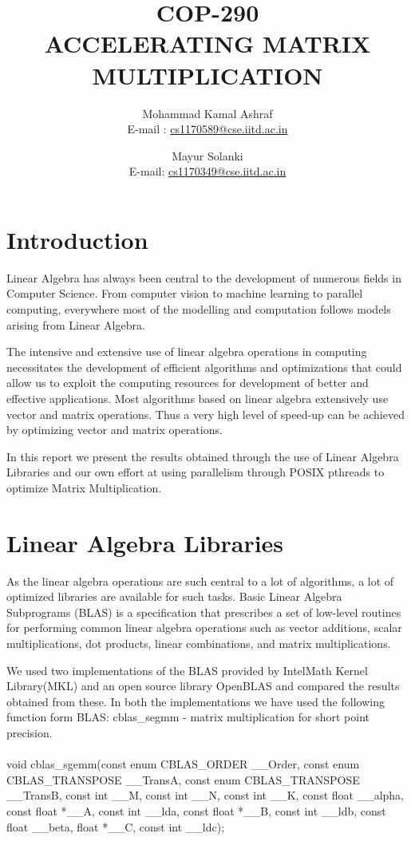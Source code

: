 \documentclass[10pt,a4paper,titlepage]{article}
\title{COP-290\\
	   ACCELERATING MATRIX MULTIPLICATION}
\author{Mohammad Kamal Ashraf \\E-mail : \href{mailto:cs1170589@cse.iitd.ac.in}{cs1170589@cse.iitd.ac.in}
\and	Mayur Solanki \\E-mail: \href{mailto:cs1170349@cse.iitd.ac.in}{cs1170349@cse.iitd.ac.in}
		}
\begin{document}
\maketitle
\section{Introduction}

Linear Algebra has always been central to the development of numerous fields in Computer Science. From computer vision to machine learning to parallel computing, everywhere most of the modelling and computation follows models arising from Linear Algebra. 

The intensive and extensive use of linear algebra operations in computing necessitates the development of efficient algorithms and optimizations that could allow us to exploit the computing resources for development of better and effective applications. Most algorithms based on linear algebra extensively use vector and matrix operations. Thus a very high level of speed-up can be achieved by optimizing vector and matrix operations.

In this report we present the results obtained through the use of Linear Algebra Libraries and our own effort at using parallelism through POSIX pthreads to optimize Matrix Multiplication.

\section{Linear Algebra Libraries}

As the linear algebra operations are such central to a lot of algorithms, a lot of optimized libraries are available for  such tasks. Basic Linear Algebra Subprograms (BLAS) is a specification that prescribes a set of low-level routines for performing common linear algebra operations such as vector additions, scalar multiplications, dot products, linear combinations, and matrix multiplications.

We used two implementations of the BLAS provided by Intel\circledR Math Kernel Library(MKL) and an open source library OpenBLAS and compared the results obtained from these. In both the implementations we have used the following function form BLAS: cblas\_segmm - matrix multiplication for short point precision.\cite{BLASfunctions}
\\
\\
void cblas\_sgemm(const enum CBLAS\_ORDER \_\_Order, const enum CBLAS\_TRANSPOSE \_\_TransA, const enum CBLAS\_TRANSPOSE \_\_TransB, const int \_\_M, const int \_\_N, const int \_\_K, const float \_\_alpha, const float *\_\_A, const int \_\_lda, const float *\_\_B, const int \_\_ldb, const float \_\_beta, float *\_\_C, const int \_\_ldc);
\end{document}
